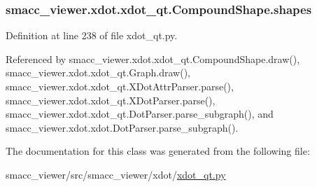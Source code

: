 \subsubsection[{\texorpdfstring{shapes}{shapes}}]{\setlength{\rightskip}{0pt plus 5cm}smacc\+\_\+viewer.\+xdot.\+xdot\+\_\+qt.\+Compound\+Shape.\+shapes}\hypertarget{classsmacc__viewer_1_1xdot_1_1xdot__qt_1_1CompoundShape_ad2f848b99323a9a844ffa4769737f69e}{}\label{classsmacc__viewer_1_1xdot_1_1xdot__qt_1_1CompoundShape_ad2f848b99323a9a844ffa4769737f69e}


Definition at line 238 of file xdot\+\_\+qt.\+py.



Referenced by smacc\+\_\+viewer.\+xdot.\+xdot\+\_\+qt.\+Compound\+Shape.\+draw(), smacc\+\_\+viewer.\+xdot.\+xdot\+\_\+qt.\+Graph.\+draw(), smacc\+\_\+viewer.\+xdot.\+xdot\+\_\+qt.\+X\+Dot\+Attr\+Parser.\+parse(), smacc\+\_\+viewer.\+xdot.\+xdot\+\_\+qt.\+X\+Dot\+Parser.\+parse(), smacc\+\_\+viewer.\+xdot.\+xdot\+\_\+qt.\+Dot\+Parser.\+parse\+\_\+subgraph(), and smacc\+\_\+viewer.\+xdot.\+xdot.\+Dot\+Parser.\+parse\+\_\+subgraph().



The documentation for this class was generated from the following file\+:\begin{DoxyCompactItemize}
\item 
smacc\+\_\+viewer/src/smacc\+\_\+viewer/xdot/\hyperlink{xdot__qt_8py}{xdot\+\_\+qt.\+py}\end{DoxyCompactItemize}
